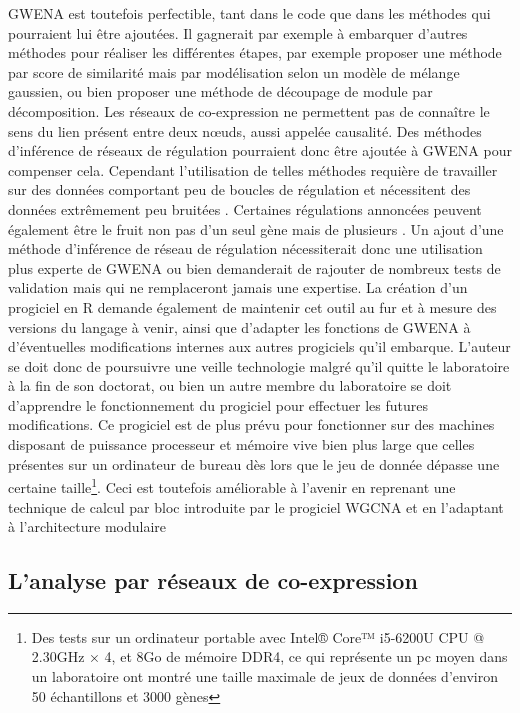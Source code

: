 GWENA est toutefois perfectible, tant dans le code que dans les méthodes qui pourraient lui être ajoutées. Il gagnerait par exemple à embarquer d'autres méthodes pour réaliser les différentes étapes, par exemple proposer une méthode par score de similarité mais par modélisation selon un modèle de mélange gaussien, ou bien proposer une méthode de découpage de module par décomposition. Les réseaux de co-expression ne permettent pas de connaître le sens du lien présent entre deux nœuds, aussi appelée causalité. Des méthodes d'inférence de réseaux de régulation pourraient donc être ajoutée à GWENA pour compenser cela. Cependant l'utilisation de telles méthodes requière de travailler sur des données comportant peu de boucles de régulation et nécessitent des données extrêmement peu bruitées \cite{Margolin2006}. Certaines régulations annoncées peuvent également être le fruit non pas d'un seul gène mais de plusieurs \cite{Chowdhury2019}. Un ajout d'une méthode d'inférence de réseau de régulation nécessiterait donc une utilisation plus experte de GWENA ou bien demanderait de rajouter de nombreux tests de validation mais qui ne remplaceront jamais une expertise. La création d'un progiciel en R demande également de maintenir cet outil au fur et à mesure des versions du langage à venir, ainsi que d'adapter les fonctions de GWENA à d'éventuelles modifications internes aux autres progiciels qu'il embarque. L'auteur se doit donc de poursuivre une veille technologie malgré qu'il quitte le laboratoire à la fin de son doctorat, ou bien un autre membre du laboratoire se doit d'apprendre le fonctionnement du progiciel pour effectuer les futures modifications. Ce progiciel est de plus prévu pour fonctionner sur des machines disposant de puissance processeur et mémoire vive bien plus large que celles présentes sur un ordinateur de bureau dès lors que le jeu de donnée dépasse une certaine taille\footnote{Des tests sur un ordinateur portable avec Intel® Core™ i5-6200U CPU @ 2.30GHz × 4, et 8Go de mémoire DDR4, ce qui représente un pc moyen dans un laboratoire ont montré une taille maximale de jeux de données d'environ 50 échantillons et 3000 gènes}. Ceci est toutefois améliorable à l'avenir en reprenant une technique de calcul par bloc introduite par le progiciel WGCNA \cite{Langfelder2008} et en l'adaptant à l'architecture modulaire



\subsection{L'analyse par réseaux de co-expression}

